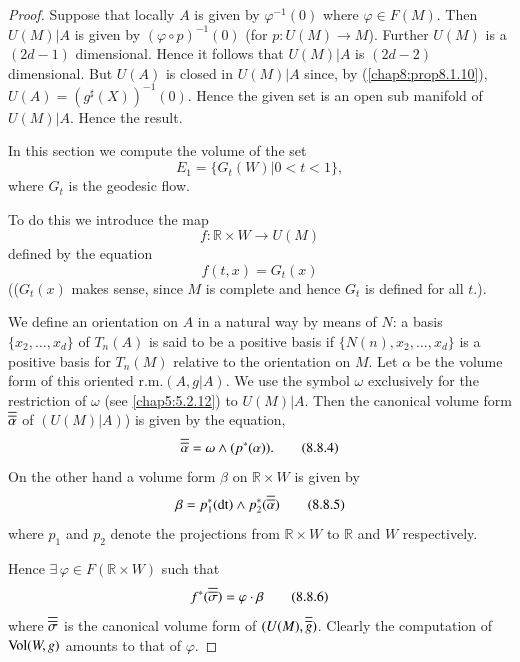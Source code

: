 \begin{proof}
Suppose that locally $A$ is given by $\varphi^{-1}(0)$ where
$\varphi\in F(M)$. Then $U(M)|A$ is given by $(\varphi\circ
p)^{-1}(0)$ (for $p:U(M)\to M$). Further $U(M)$ is a $(2d-1)$
dimensional. Hence it follows that $U(M)|A$ is $(2d-2)$
dimensional. But $U(A)$ is closed in $U(M)|A$ since, by
(\ref{chap8:prop8.1.10}), $U(A)=(g^{\sharp}(X))^{-1}(0)$. Hence the given
set is an open sub manifold of $U(M)|A$. Hence the result.

In this section we compute the volume of the set 
\begin{equation*}
E_{1}=\{G_{t}(W)|0<t<1\},\tag{8.8.2}\label{chap8:8.8.2}
\end{equation*}
where $G_{t}$ is the geodesic flow.

To do this we introduce the map
$$
f:\mathbb{R}\times W\to U(M)
$$
defined by the equation
\begin{equation*}
f(t,x)=G_{t}(x)\tag{8.8.3}\label{chap8:8.8.3}
\end{equation*}
(($G_{t}(x)$ makes sense, since $M$ is complete and hence $G_{t}$ is
defined for all $t$.).

We define an orientation on $A$ in a natural way by means of $N$: a
basis $\{x_{2},\ldots,x_{d}\}$ of $T_{n}(A)$ is said to be a positive
basis if $\{N(n),x_{2},\ldots,x_{d}\}$ \pageoriginale is a positive
basis for $T_{n}(M)$ relative to the orientation on $M$. Let $\alpha$
be the volume form of this oriented r.m.\@ $(A,g|A)$. We use the
symbol $\omega$ exclusively for the restriction of $\omega$ (see
\eqref{chap5:5.2.12}) to $U(M)|A$. Then the canonical volume form
$\overline{\overline{\alpha}}$ of $(U(M)|A)$) is given by the equation,
\begin{equation*}
\overline{\overline{\alpha}}=\omega\wedge(p^{\ast}(\alpha)).\tag{8.8.4}\label{chap8:8.8.4}
\end{equation*}
On the other hand a volume form $\beta$ on $\mathbb{R}\times W$ is
given by
\begin{equation*}
\beta=p^{\ast}_{1}(\operatorname{dt})\wedge p^{\ast}_{2}(\overline{\overline{\alpha}})\tag{8.8.5}\label{chap8:8.8.5}
\end{equation*}
where $p_{1}$ and $p_{2}$ denote the projections from
$\mathbb{R}\times W$ to $\mathbb{R}$ and $W$ respectively.

Hence $\exists\, \varphi\in F(\mathbb{R}\times W)$ such that
\begin{equation*}
f^{\ast}(\overline{\overline{\sigma}})=\varphi\cdot\beta\tag{8.8.6}\label{chap8:8.8.6}
\end{equation*}
where $\overline{\overline{\sigma}}$ is the canonical volume form of
$(U(M),\overline{\overline{g}})$. Clearly the computation of $\operatorname{Vol}(W,g)$ amounts to
that of $\varphi$.
\end{proof}

